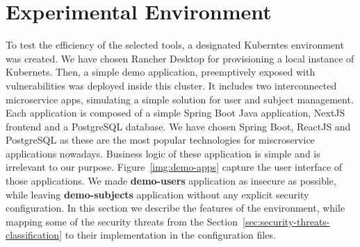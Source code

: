 \section{Experimental Environment}
\label{sec:experimental-environment}

To test the efficiency of the selected tools, a designated Kuberntes environment was created. We have chosen Rancher Desktop for provisioning a local instance of Kubernets. Then, a simple demo application, preemptively exposed with vulnerabilities was deployed inside this cluster. It includes two interconnected microservice apps, simulating a simple solution for user and subject management. Each application is composed of a simple Spring Boot Java application, NextJS frontend and a PostgreSQL database. We have chosen Spring Boot, ReactJS and PostgreSQL as these are the most popular technologies for miscroservice applications nowadays. Business logic of these application is simple and is irrelevant to our purpose. Figure~\ref{img:demo-apps} capture the user interface of those applications. We made \textbf{demo-users} application as insecure as possible, while leaving \textbf{demo-subjects} application without any explicit security configuration. In this section we describe the features of the environment, while mapping some of the security threats from the Section~\ref{sec:security-threats-classification} to their implementation in the configuration files.

